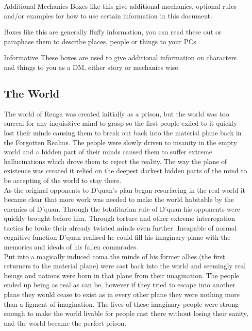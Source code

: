 \documentclass[10pt,twoside,twocolumn]{article}
\begin{document}

\begin{paperbox}{Additional Mechanics}
Boxes like this give additional mechanics, optional rules and/or examples for how to use certain information in this document.
\end{paperbox}

\begin{quotebox}
Boxes like this are generally fluffy information, you can read these out or paraphase them to describe places, people or things to your PCs.
\end{quotebox}

\begin{commentbox}{Informative}
These boxes are used to give additional information on characters and things to you as a DM, either story or mechanics wise.
\end{commentbox}

\subsection{The World}
The world of Renga was created initially as a prison, but the world was too surreal for any inquisitive mind to grasp so the first people exiled to it quickly lost their minds causing them to break out back into the material plane back in the Forgotten Realms. The people were slowly driven to insanity in the empty world and a hidden part of their minds caused them to suffer extreme hallucinations which drove them to reject the reality. The way the plane of existence was created it relied on the deepest darkest hidden parts of the mind to be accepting of the world to stay there.\\

As the original opponents to D'quan's plan began resurfacing in the real world it became clear that more work was needed to make the world habitable by the enemies of D'quan. Through the totalitarian rule of D'quan his opponents were quickly brought before him. Through torture and other extreme interrogation tactics he broke their already twisted minds even further. Incapable of normal cognitive function D'quan realised he could fill his imaginary plane with the memories and ideals of his fallen commrades.\\

Put into a magically induced coma the minds of his former allies (the first returners to the material plane) were cast back into the world and seemingly real beings and nations were born in that plane from their imagination. The people ended up being as real as can be, however if they tried to escape into another plane they would cease to exist as in every other plane they were nothing more than a figment of imagination. The lives of these imaginary people were strong enough to make the world livable for people cast there without losing their sanity, and the world became the perfect prison.\\
\end{document}
